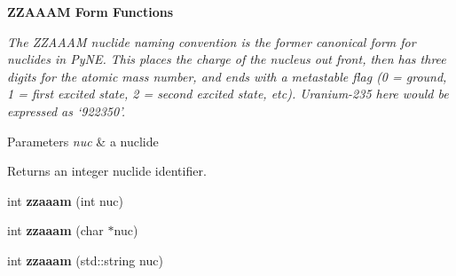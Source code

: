 \begin{Indent}{\bf Z\-Z\-A\-A\-A\-M Form Functions}\par
{\em The Z\-Z\-A\-A\-A\-M nuclide naming convention is the former canonical form for nuclides in Py\-N\-E. This places the charge of the nucleus out front, then has three digits for the atomic mass number, and ends with a metastable flag (0 = ground, 1 = first excited state, 2 = second excited state, etc). Uranium-\/235 here would be expressed as ‘922350’. 
\begin{DoxyParams}{Parameters}
{\em nuc} & a nuclide \\
\hline
\end{DoxyParams}
\begin{DoxyReturn}{Returns}
an integer nuclide identifier. 
\end{DoxyReturn}
}\begin{DoxyCompactItemize}
\item 
\hypertarget{namespacepyne_1_1nucname_ac28bf4202f94c1902bdcb2f0caf314e3}{int {\bfseries zzaaam} (int nuc)}\label{namespacepyne_1_1nucname_ac28bf4202f94c1902bdcb2f0caf314e3}

\item 
\hypertarget{namespacepyne_1_1nucname_ae8f1eddf40a92a093103aa2b4adee432}{int {\bfseries zzaaam} (char $\ast$nuc)}\label{namespacepyne_1_1nucname_ae8f1eddf40a92a093103aa2b4adee432}

\item 
\hypertarget{namespacepyne_1_1nucname_aff543a0a9df5e199902780b49d4e82f6}{int {\bfseries zzaaam} (std\-::string nuc)}\label{namespacepyne_1_1nucname_aff543a0a9df5e199902780b49d4e82f6}

\end{DoxyCompactItemize}
\end{Indent}
